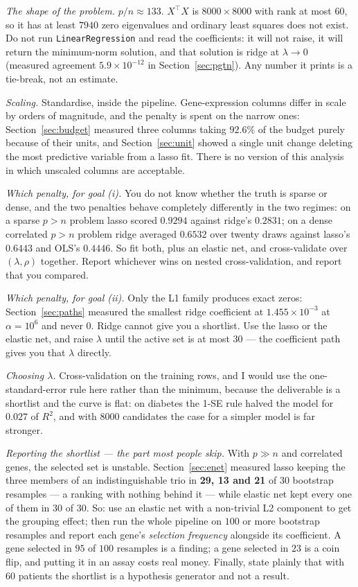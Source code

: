 \documentclass[11pt]{article}
\newcommand{\XtX}{X^{\!\top}\!X}
\begin{document}
\emph{The shape of the problem.} $p/n \approx 133$. $\XtX$ is
$8000\times8000$ with rank at most $60$, so it has at least $7940$ zero
eigenvalues and ordinary least squares does not exist. Do not run
\texttt{LinearRegression} and read the coefficients: it will not raise, it
will return the minimum-norm solution, and that solution is ridge at
$\lambda\to0$ (measured agreement $5.9\times10^{-12}$ in
Section~\ref{sec:pgtn}). Any number it prints is a tie-break, not an estimate.

\emph{Scaling.} Standardise, inside the pipeline. Gene-expression columns
differ in scale by orders of magnitude, and the penalty is spent on the
narrow ones: Section~\ref{sec:budget} measured three columns taking $92.6\%$
of the budget purely because of their units, and Section~\ref{sec:unit}
showed a single unit change deleting the most predictive variable from a
lasso fit. There is no version of this analysis in which unscaled columns are
acceptable.

\emph{Which penalty, for goal (i).} You do not know whether the truth is
sparse or dense, and the two penalties behave completely differently in the
two regimes: on a sparse $p>n$ problem lasso scored $0.9294$ against ridge's
$0.2831$; on a dense correlated $p>n$ problem ridge averaged $0.6532$ over
twenty draws against lasso's $0.6443$ and OLS's $0.4446$. So fit both, plus an
elastic net, and
cross-validate over $(\lambda, \rho)$ together. Report whichever wins on
nested cross-validation, and report that you compared.

\emph{Which penalty, for goal (ii).} Only the L1 family produces exact zeros:
Section~\ref{sec:paths} measured the smallest ridge coefficient at
$1.455\times10^{-3}$ at $\alpha = 10^{6}$ and never $0$. Ridge cannot give you
a shortlist. Use the lasso or the elastic net, and raise $\lambda$ until the
active set is at most $30$ --- the coefficient path gives you that $\lambda$
directly.

\emph{Choosing $\lambda$.} Cross-validation on the training rows, and I would
use the one-standard-error rule here rather than the minimum, because the
deliverable is a shortlist and the curve is flat: on diabetes the 1-SE rule
halved the model for $0.027$ of $R^2$, and with $8000$ candidates the case for
a simpler model is far stronger.

\emph{Reporting the shortlist --- the part most people skip.} With $p \gg n$
and correlated genes, the selected set is unstable. Section~\ref{sec:enet}
measured lasso keeping the three members of an indistinguishable trio in
\textbf{29, 13 and 21} of $30$ bootstrap resamples --- a ranking with nothing
behind it --- while elastic net kept every one of them in $30$ of $30$. So: use an elastic net with a non-trivial L2 component to get the
grouping effect; then run the whole pipeline on $100$ or more bootstrap
resamples and report each gene's \emph{selection frequency} alongside its
coefficient. A gene selected in $95$ of $100$ resamples is a finding; a gene
selected in $23$ is a coin flip, and putting it in an assay costs real money.
Finally, state plainly that with $60$ patients the shortlist is a hypothesis
generator and not a result.
\end{document}
